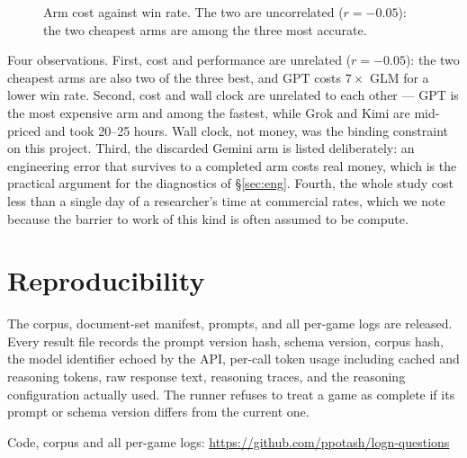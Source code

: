 \documentclass[11pt]{article}
\begin{document}
\begin{figure}[tbp]
\centering
{}
\caption{Arm cost against win rate. The two are uncorrelated ($r=-0.05$): the two cheapest arms are among the three most accurate.}
\label{fig:cost}
\end{figure}

Four observations. First, cost and performance are unrelated ($r=-0.05$):
the two cheapest arms are also two of the three best, and GPT costs $7\times$
GLM for a lower win rate. Second, cost and wall clock are unrelated to each
other --- GPT is the most expensive arm and among the fastest, while Grok and
Kimi are mid-priced and took 20--25 hours. Wall clock, not money, was the
binding constraint on this project. Third, the discarded Gemini arm is listed
deliberately: an engineering error that survives to a completed arm costs real
money, which is the practical argument for the diagnostics of \S\ref{sec:eng}.
Fourth, the whole study cost less than a single day of a researcher's time at
commercial rates, which we note because the barrier to work of this kind is
often assumed to be compute.

\section{Reproducibility}

The corpus, document-set manifest, prompts, and all per-game logs are released.
Every result file records the prompt version hash, schema version, corpus hash,
the model identifier echoed by the API, per-call token usage including cached
and reasoning tokens, raw response text, reasoning traces, and the reasoning
configuration actually used. The runner refuses to treat a game as complete if
its prompt or schema version differs from the current one.

Code, corpus and all per-game logs:
\url{https://github.com/ppotash/logn-questions}
\end{document}
